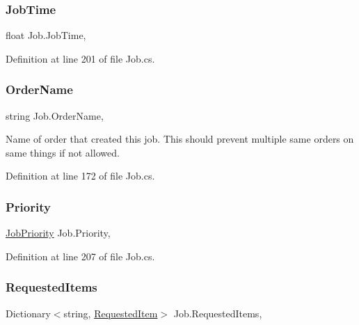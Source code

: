 \subsubsection{\texorpdfstring{Job\+Time}{JobTime}}
{\footnotesize\ttfamily float Job.\+Job\+Time\hspace{0.3cm}{\ttfamily [get]}, {}}



Definition at line 201 of file Job.\+cs.

\mbox{\label{class_job_abff4812529dfc153d28274a818128243}} 
\subsubsection{\texorpdfstring{Order\+Name}{OrderName}}
{\footnotesize\ttfamily string Job.\+Order\+Name\hspace{0.3cm}{\ttfamily [get]}, {\ttfamily [set]}}



Name of order that created this job. This should prevent multiple same orders on same things if not allowed. 



Definition at line 172 of file Job.\+cs.

\mbox{\label{class_job_a559abd8b2b3087742adc0ccb1045af7d}} 
\subsubsection{\texorpdfstring{Priority}{Priority}}
{\footnotesize\ttfamily \hyperlink{class_job_a9c7ab1966c2a0a1d29a7f5822cbca45a}{Job\+Priority} Job.\+Priority\hspace{0.3cm}{\ttfamily [get]}, {}}



Definition at line 207 of file Job.\+cs.

\mbox{\label{class_job_adf323467d52d8b22ce88d9df48883c52}} 
\subsubsection{\texorpdfstring{Requested\+Items}{RequestedItems}}
{\footnotesize\ttfamily Dictionary$<$string, \hyperlink{class_project_porcupine_1_1_jobs_1_1_requested_item}{Requested\+Item}$>$ Job.\+Requested\+Items\hspace{0.3cm}{\ttfamily [get]}, {\ttfamily [set]}}



